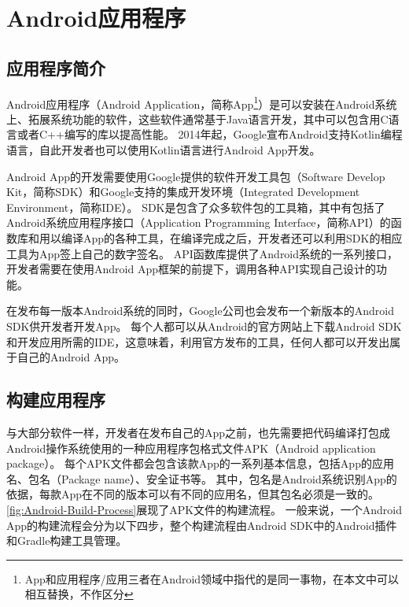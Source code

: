 \section{Android应用程序}

\subsection{应用程序简介}

Android应用程序（Android Application，简称App\footnote{App和应用程序/应用三者在Android领域中指代的是同一事物，在本文中可以相互替换，不作区分}）是可以安装在Android系统上、拓展系统功能的软件，这些软件通常基于Java语言开发，其中可以包含用C语言或者C++编写的库以提高性能。
2014年起，Google宣布Android支持Kotlin编程语言，自此开发者也可以使用Kotlin语言进行Android App开发。

Android App的开发需要使用Google提供的软件开发工具包（Software Develop Kit，简称SDK）和Google支持的集成开发环境（Integrated Development Environment，简称IDE）。
SDK是包含了众多软件包的工具箱，其中有包括了Android系统应用程序接口（Application Programming Interface，简称API）的函数库和用以编译App的各种工具，在编译完成之后，开发者还可以利用SDK的相应工具为App签上自己的数字签名。
API函数库提供了Android系统的一系列接口，开发者需要在使用Android App框架的前提下，调用各种API实现自己设计的功能。

在发布每一版本Android系统的同时，Google公司也会发布一个新版本的Android SDK供开发者开发App。
每个人都可以从Android的官方网站上下载Android SDK和开发应用所需的IDE，这意味着，利用官方发布的工具，任何人都可以开发出属于自己的Android App。

\subsection{构建应用程序}

与大部分软件一样，开发者在发布自己的App之前，也先需要把代码编译打包成Android操作系统使用的一种应用程序包格式文件APK（Android application package）。
每个APK文件都会包含该款App的一系列基本信息，包括App的应用名、包名（Package name）、安全证书等。
其中，包名是Android系统识别App的依据，每款App在不同的版本可以有不同的应用名，但其包名必须是一致的。
\autoref{fig:Android-Build-Process}展现了APK文件的构建流程。
一般来说，一个Android App的构建流程会分为以下四步，整个构建流程由Android SDK中的Android插件和Gradle构建工具管理。

